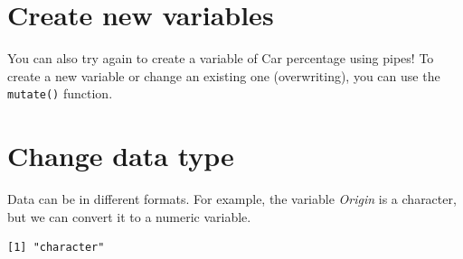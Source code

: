 \documentclass[
  letterpaper,
  DIV=11,
  numbers=noendperiod]{scrreprt}
\newenvironment{Shaded}{\begin{snugshade}}{\end{snugshade}}
\newcommand{\AttributeTok}[1]{\textcolor[rgb]{0.40,0.45,0.13}{#1}}
\newcommand{\CommentTok}[1]{\textcolor[rgb]{0.37,0.37,0.37}{#1}}
\newcommand{\DecValTok}[1]{\textcolor[rgb]{0.68,0.00,0.00}{#1}}
\newcommand{\FunctionTok}[1]{\textcolor[rgb]{0.28,0.35,0.67}{#1}}
\newcommand{\NormalTok}[1]{\textcolor[rgb]{0.00,0.23,0.31}{#1}}
\newcommand{\OtherTok}[1]{\textcolor[rgb]{0.00,0.23,0.31}{#1}}
\newcommand{\SpecialCharTok}[1]{\textcolor[rgb]{0.37,0.37,0.37}{#1}}
\begin{document}
\section{Create new variables}\label{create-new-variables}

You can also try again to create a variable of Car percentage using
pipes! To create a new variable or change an existing one (overwriting),
you can use the \texttt{mutate()} function.

\begin{Shaded}
\end{Shaded}

\section{Change data type}\label{change-data-type}

Data can be in different formats. For example, the variable
\emph{Origin} is a character, but we can convert it to a numeric
variable.

\begin{Shaded}
\end{Shaded}

\begin{verbatim}
[1] "character"
\end{verbatim}

\begin{Shaded}
\end{Shaded}
\end{document}
